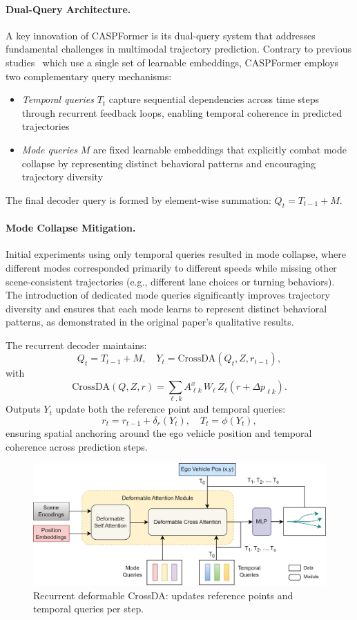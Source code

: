 \paragraph{Dual-Query Architecture.} A key innovation of CASPFormer is its dual-query system that addresses fundamental challenges in multimodal trajectory prediction. Contrary to previous studies~\cite{girgis2021latent,varadarajan2022multipath++,zhou2023query} which use a single set of learnable embeddings, CASPFormer employs two complementary query mechanisms:
\begin{itemize}
\item \emph{Temporal queries} $T_t$ capture sequential dependencies across time steps through recurrent feedback loops, enabling temporal coherence in predicted trajectories
\item \emph{Mode queries} $M$ are fixed learnable embeddings that explicitly combat mode collapse by representing distinct behavioral patterns and encouraging trajectory diversity
\end{itemize}
The final decoder query is formed by element-wise summation: $Q_t = T_{t-1} + M$.

\paragraph{Mode Collapse Mitigation.} Initial experiments using only temporal queries resulted in mode collapse, where different modes corresponded primarily to different speeds while missing other scene-consistent trajectories (e.g., different lane choices or turning behaviors). The introduction of dedicated mode queries significantly improves trajectory diversity and ensures that each mode learns to represent distinct behavioral patterns, as demonstrated in the original paper's qualitative results.

The recurrent decoder maintains:
\[
Q_t = T_{t-1} + M,\quad
Y_t = \mathrm{CrossDA}(Q_t,Z,r_{t-1}),
\]
with
\[
\mathrm{CrossDA}(Q,Z,r)
=\sum_{\ell,k}A^{\mathit{x}}_{\ell k}\,W_\ell\,Z_\ell(r+\Delta p_{\ell k}).
\]
Outputs $Y_t$ update both the reference point and temporal queries:
\[
r_t = r_{t-1} + \delta_r(Y_t),\quad
T_t = \phi(Y_t),
\]
ensuring spatial anchoring around the ego vehicle position and temporal coherence across prediction steps.
\begin{figure}[ht]
  \centering
  \includegraphics[width=\linewidth]{figures/caspformer_decoder.jpg}
  \caption{Recurrent deformable CrossDA: updates reference points and temporal queries per step.}
  \label{fig:recurrent_architecture}
\end{figure}

